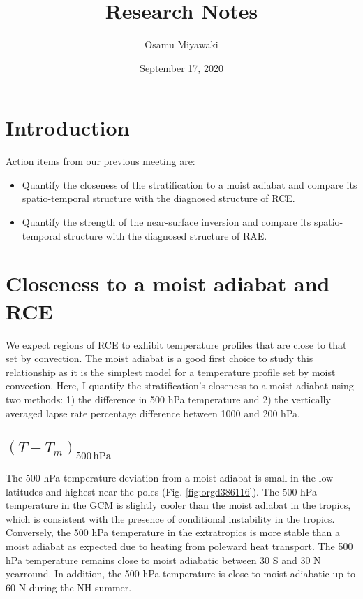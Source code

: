 \documentclass[11pt]{article}
\author{Osamu Miyawaki}
\date{September 17, 2020}
\title{Research Notes}
\begin{document}
\maketitle

\section{Introduction}
\label{sec:org830e49f}
Action items from our previous meeting are:
\begin{itemize}
\item Quantify the closeness of the stratification to a moist adiabat and compare its spatio-temporal structure with the diagnosed structure of RCE.
\item Quantify the strength of the near-surface inversion and compare its spatio-temporal structure with the diagnosed structure of RAE.
\end{itemize}

\section{Closeness to a moist adiabat and RCE}
\label{sec:org763d95b}
We expect regions of RCE to exhibit temperature profiles that are close to that set by convection. The moist adiabat is a good first choice to study this relationship as it is the simplest model for a temperature profile set by moist convection. Here, I quantify the stratification's closeness to a moist adiabat using two methods: 1) the difference in 500 hPa temperature and 2) the vertically averaged lapse rate percentage difference between 1000 and 200 hPa.

\subsection{\((T-T_m)_{500\,\mathrm{hPa}}\)}
\label{sec:org64e27bf}
The 500 hPa temperature deviation from a moist adiabat is small in the low latitudes and highest near the poles (Fig. \ref{fig:orgd386116}). The 500 hPa temperature in the GCM is slightly cooler than the moist adiabat in the tropics, which is consistent with the presence of conditional instability in the tropics. Conversely, the 500 hPa temperature in the extratropics is more stable than a moist adiabat as expected due to heating from poleward heat transport. The 500 hPa temperature remains close to moist adiabatic between 30 S and 30 N  yearround. In addition, the 500 hPa temperature is close to moist adiabatic up to 60 N during the NH summer.
\end{document}
